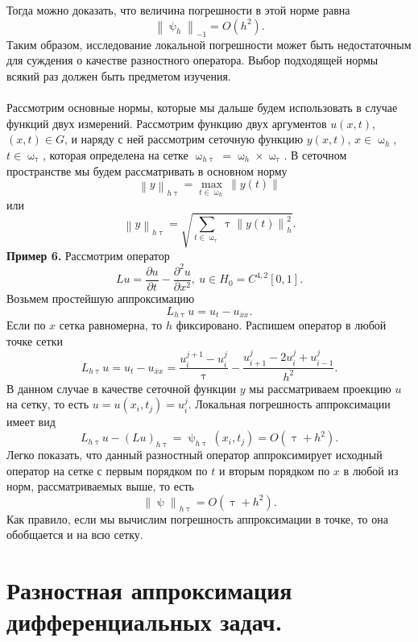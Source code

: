 \documentclass[a4paper, 12pt]{report}
\numberwithin{equation}{section}
\newcommand{\ol}{\overline}
\renewcommand{\tau}{\uptau}
\renewcommand{\psi}{\uppsi}
\renewcommand{\omega}{\upomega}
\renewcommand{\d}{\partial}
\newcommand\Norm[1]{\left\| #1 \right\|}
\begin{document}
Тогда можно доказать, что величина погрешности в этой норме равна
$$\Norm{\psi_h}_{-1} = O(h^2).$$
Таким образом, исследование локальной погрешности может быть недостаточным для суждения о качестве разностного оператора.
Выбор подходящей нормы всякий раз должен быть предметом изучения. \\\\
Рассмотрим основные нормы, которые мы дальше будем использовать в случае функций двух измерений. Рассмотрим функцию двух аргументов $u(x,t)$, $(x,t) \in G$, и наряду с ней рассмотрим сеточную функцию $y(x,t)$, $x \in \omega_h$, $t \in \omega_\tau$, которая определена на сетке $\omega_{h\tau} = \omega_h \times \omega_\tau$. В сеточном пространстве мы будем рассматривать в основном норму 
$$\Norm{y}_{h\tau} = \underset{t \in \omega_h}{\max}\Norm{y(t)}$$
или 
$$\Norm{y}_{h\tau} = \sqrt{\sum_{t \in \omega_\tau}\tau \Norm{y(t)}_h^2}.$$
\textbf{Пример 6.}
Рассмотрим оператор $$Lu = \dfrac{\d u}{\d t} - \dfrac{\d ^2 u}{\d x ^2},\ u \in H_0 = C^{4,2}[0,1].$$
Возьмем простейшую аппроксимацию
$$L_{h\tau}u = u_t - u_{\ol xx}.$$
Если по $x$ сетка равномерна, то $h$ фиксировано. Распишем оператор в любой точке сетки
$$L_{h\tau}u = u_t - u_{\ol xx} = \dfrac{u_i^{j+1} - u_i^j}{\tau} - \dfrac{u_{i+1}^j - 2u_i^j + u_{i-1}^j}{h^2}.$$
В данном случае в качестве сеточной функции $y$ мы рассматриваем проекцию $u$ на сетку, то есть $u=u(x_i, t_j) = u_i^j$.
Локальная погрешность аппроксимации имеет вид $$L_{h\tau}u - (Lu)_{h\tau} = \psi_{h\tau}(x_i, t_j) = O(\tau + h^2).$$
Легко показать, что данный разностный оператор аппроксимирует исходный оператор на сетке с первым порядком по $t$ и вторым порядком по $x$ в любой из норм, рассматриваемых выше, то есть 
$$\Norm{\psi}_{h\tau} = O(\tau + h^2).$$
Как правило, если мы вычислим погрешность аппроксимации в точке, то она обобщается и на всю сетку.
\section{Разностная аппроксимация дифференциальных задач.}
\end{document}
